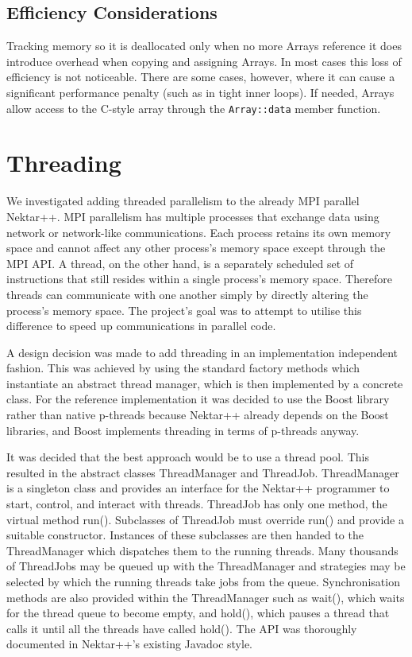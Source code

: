 \subsection{Efficiency Considerations}

Tracking memory so it is deallocated only when no more Arrays reference it does
introduce overhead when copying and assigning Arrays. In most cases this loss of
efficiency is not noticeable. There are some cases, however, where it can cause
a significant performance penalty (such as in tight inner loops). If needed,
Arrays allow access to the C-style array through the \texttt{Array::data} member
function.


\section{Threading}
We investigated adding threaded parallelism to the already MPI parallel
Nektar++.  MPI parallelism has multiple processes that exchange data using
network or network-like communications.  Each process retains its own memory
space and cannot affect any other process’s memory space except through the MPI
API.  A thread, on the other hand, is a separately scheduled set of instructions
that still resides within a single process’s memory space.  Therefore threads
can communicate with one another simply by directly altering the process’s
memory space.  The project's goal was to attempt to utilise this difference to
speed up communications in parallel code.

A design decision was made to add threading in an implementation independent
fashion.  This was achieved by using the standard factory methods which
instantiate an abstract thread manager, which is then implemented by a concrete
class.  For the reference implementation it was decided to use the Boost library
rather than native p-threads because Nektar++ already depends on the Boost
libraries, and Boost implements threading in terms of p-threads anyway.

It was decided that the best approach would be to use a thread pool.  This
resulted in the abstract classes ThreadManager and ThreadJob.  ThreadManager is
a singleton class and provides an interface for the Nektar++ programmer to
start, control, and interact with threads.  ThreadJob has only one method, the
virtual method run().  Subclasses of ThreadJob must override run() and provide a
suitable constructor.  Instances of these subclasses are then handed to the
ThreadManager which dispatches them to the running threads.  Many thousands of
ThreadJobs may be queued up with the ThreadManager and strategies may be
selected by which the running threads take jobs from the queue.  Synchronisation
methods are also provided within the ThreadManager such as wait(), which waits
for the thread queue to become empty, and hold(), which pauses a thread that
calls it until all the threads have called hold().  The API was thoroughly
documented in Nektar++’s existing Javadoc style.

